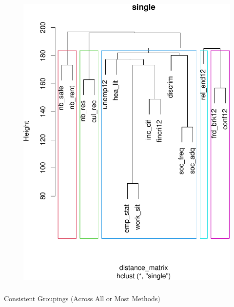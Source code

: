 \documentclass[
]{article}
\makeatletter
\let\oldsubparagraph\subparagraph
\renewcommand{\subparagraph}{
    \@ifstar
      \xxxSubParagraphStar
      \xxxSubParagraphNoStar
  }
\newcommand{\xxxSubParagraphStar}[1]{\oldsubparagraph*{#1}\mbox{}}
\newcommand{\xxxSubParagraphNoStar}[1]{\oldsubparagraph{#1}\mbox{}}
\makeatother
\begin{document}
\begin{figure}
\begin{minipage}{0.50\linewidth}
\begin{center}
\includegraphics{draft_v3_files/figure-pdf/unnamed-chunk-19-4.pdf}
\end{center}
\end{minipage}%

\end{figure}%

\subparagraph{Consistent Groupings (Across All or Most
Methods)}\label{consistent-groupings-across-all-or-most-methods}
\end{document}

